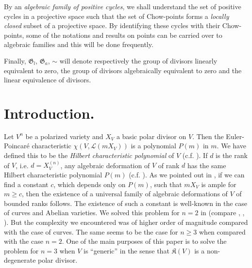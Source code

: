 By an {\em algebraic family of positive cycles}, we shall understand the set of positive cycles in a projective space such that the set of Chow-points forms a {\em locally closed} subset of a projective space. By identifying these cycles with their Chow-points, some of the notations and results on points can be carried over to algebraic families and this will be done frequently.

Finally, $\mathfrak{G}_{l}$, $\mathfrak{G}_{a}$, $\sim$ will denote respectively the group of divisors linearly equivalent to zero, the group of divisors algebraically equivalent to zero and the linear equivalence of divisors.

\section*{Introduction.}\pageoriginale

Let $V^{n}$ be a polarized variety and $X_{V}$ a basic polar divisor on $V$. Then the Euler-Poincar\'e characteristic $\chi(V,\mathscr{L}(mX_{V}))$ is a polynomial $P(m)$ in $m$. We have defined this to be the {\em Hilbert characteristic polynomial} of $V$ (c.f. \cite{art14-key16}). If $d$ is the rank of $V$, i.e. $d=X^{(n)}_{V}$, any algebraic deformation of $V$ of rank $d$ has the same Hilbert characteristic polynomial $P(m)$ (c.f. \cite{art14-key16}). As we pointed out in \cite{art14-key16}, if we can find a constant $c$, which depends only on $P(m)$, such that $mX_{V}$ is ample for $m\geq c$, then the existence of a universal family of algebraic deformations of $V$ of bounded ranks follows. The existence of such a constant is well-known in the case of curves and Abelian varieties. We solved this problem for $n=2$ in \cite{art14-key17} (compare \cite{art14-key9}, \cite{art14-key10}, \cite{art14-key12}). But the complexity we encountered was of higher order of magnitude compared with the case of curves. The same seems to be the case for $n\geq 3$ when compared with the case $n=2$. One of the main purposes of this paper is to solve the problem for $n=3$ when $V$ is ``generic'' in the sense that $\mathfrak{K}(V)$ is a non-degenerate polar divisor.

